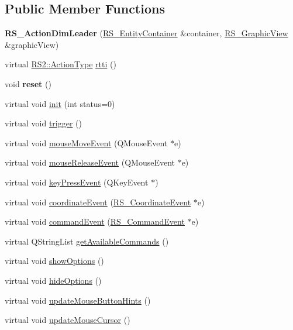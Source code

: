 \subsection*{Public Member Functions}
\begin{DoxyCompactItemize}
\item 
\hypertarget{classRS__ActionDimLeader_a93bc9c1ce5923d51d6f456d06bbcc0f6}{{\bfseries R\-S\-\_\-\-Action\-Dim\-Leader} (\hyperlink{classRS__EntityContainer}{R\-S\-\_\-\-Entity\-Container} \&container, \hyperlink{classRS__GraphicView}{R\-S\-\_\-\-Graphic\-View} \&graphic\-View)}\label{classRS__ActionDimLeader_a93bc9c1ce5923d51d6f456d06bbcc0f6}

\item 
virtual \hyperlink{classRS2_afe3523e0bc41fd637b892321cfc4b9d7}{R\-S2\-::\-Action\-Type} \hyperlink{classRS__ActionDimLeader_ac24b98915d1d6fb8ec7cefc318444d95}{rtti} ()
\item 
\hypertarget{classRS__ActionDimLeader_a47933bbdce2868593cd98717eb0d5bc0}{void {\bfseries reset} ()}\label{classRS__ActionDimLeader_a47933bbdce2868593cd98717eb0d5bc0}

\item 
virtual void \hyperlink{classRS__ActionDimLeader_afb9e4c8a5263913d7f94f08b52a3557b}{init} (int status=0)
\item 
virtual void \hyperlink{classRS__ActionDimLeader_aa7d60324f93cb5fb08523745f2f2b32d}{trigger} ()
\item 
virtual void \hyperlink{classRS__ActionDimLeader_a59c6f2cbfd97a4d6364741dd3efbe24e}{mouse\-Move\-Event} (Q\-Mouse\-Event $\ast$e)
\item 
virtual void \hyperlink{classRS__ActionDimLeader_a31686baa6ed67e628889d88447693454}{mouse\-Release\-Event} (Q\-Mouse\-Event $\ast$e)
\item 
virtual void \hyperlink{classRS__ActionDimLeader_a684a127ffefdafe9bff9ed58fd88cdd3}{key\-Press\-Event} (Q\-Key\-Event $\ast$)
\item 
virtual void \hyperlink{classRS__ActionDimLeader_a86f30eedc29aefd8b16e5405d9e20ddf}{coordinate\-Event} (\hyperlink{classRS__CoordinateEvent}{R\-S\-\_\-\-Coordinate\-Event} $\ast$e)
\item 
virtual void \hyperlink{classRS__ActionDimLeader_a4d3a7f64b2baa3466070129fcd9f23b5}{command\-Event} (\hyperlink{classRS__CommandEvent}{R\-S\-\_\-\-Command\-Event} $\ast$e)
\item 
virtual Q\-String\-List \hyperlink{classRS__ActionDimLeader_a73ac05e20d9e56c4f606c88d0c5f7e5f}{get\-Available\-Commands} ()
\item 
virtual void \hyperlink{classRS__ActionDimLeader_a33cfe2b1dd78f2bfcbc53c8ba9450306}{show\-Options} ()
\item 
virtual void \hyperlink{classRS__ActionDimLeader_ae905f9b059be54a8f45adae1ac45cf05}{hide\-Options} ()
\item 
virtual void \hyperlink{classRS__ActionDimLeader_afdc55049061946b7d765963e6a0c91b7}{update\-Mouse\-Button\-Hints} ()
\item 
virtual void \hyperlink{classRS__ActionDimLeader_a94c4ebaa9b1c836955ceb5863d5b6dca}{update\-Mouse\-Cursor} ()
\end{DoxyCompactItemize}
